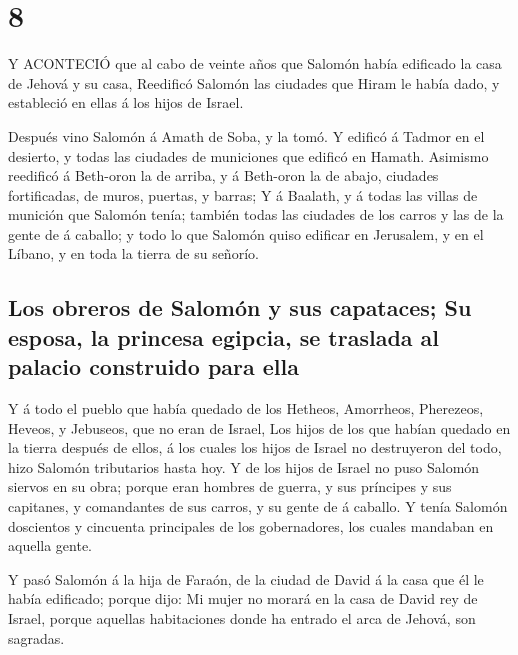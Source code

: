 \hypertarget{section-7}{%
\section{8}\label{section-7}}

 Y ACONTECIÓ que al cabo de veinte años que Salomón había
edificado la casa de Jehová y su casa,  Reedificó Salomón
las ciudades que Hiram le había dado, y estableció en ellas á los hijos
de Israel.

 Después vino Salomón á Amath de Soba, y la tomó.
 Y edificó á Tadmor en el desierto, y todas las ciudades de
municiones que edificó en Hamath.  Asimismo reedificó á
Beth-oron la de arriba, y á Beth-oron la de abajo, ciudades
fortificadas, de muros, puertas, y barras;  Y á Baalath, y á
todas las villas de munición que Salomón tenía; también todas las
ciudades de los carros y las de la gente de á caballo; y todo lo que
Salomón quiso edificar en Jerusalem, y en el Líbano, y en toda la tierra
de su señorío.

\hypertarget{los-obreros-de-salomuxf3n-y-sus-capataces-su-esposa-la-princesa-egipcia-se-traslada-al-palacio-construido-para-ella}{%
\subsection{Los obreros de Salomón y sus capataces; Su esposa, la
princesa egipcia, se traslada al palacio construido para
ella}\label{los-obreros-de-salomuxf3n-y-sus-capataces-su-esposa-la-princesa-egipcia-se-traslada-al-palacio-construido-para-ella}}

 Y á todo el pueblo que había quedado de los Hetheos,
Amorrheos, Pherezeos, Heveos, y Jebuseos, que no eran de Israel,
 Los hijos de los que habían quedado en la tierra después de
ellos, á los cuales los hijos de Israel no destruyeron del todo, hizo
Salomón tributarios hasta hoy.  Y de los hijos de Israel no
puso Salomón siervos en su obra; porque eran hombres de guerra, y sus
príncipes y sus capitanes, y comandantes de sus carros, y su gente de á
caballo.  Y tenía Salomón doscientos y cincuenta
principales de los gobernadores, los cuales mandaban en aquella gente.

 Y pasó Salomón á la hija de Faraón, de la ciudad de David
á la casa que él le había edificado; porque dijo: Mi mujer no morará en
la casa de David rey de Israel, porque aquellas habitaciones donde ha
entrado el arca de Jehová, son sagradas.

